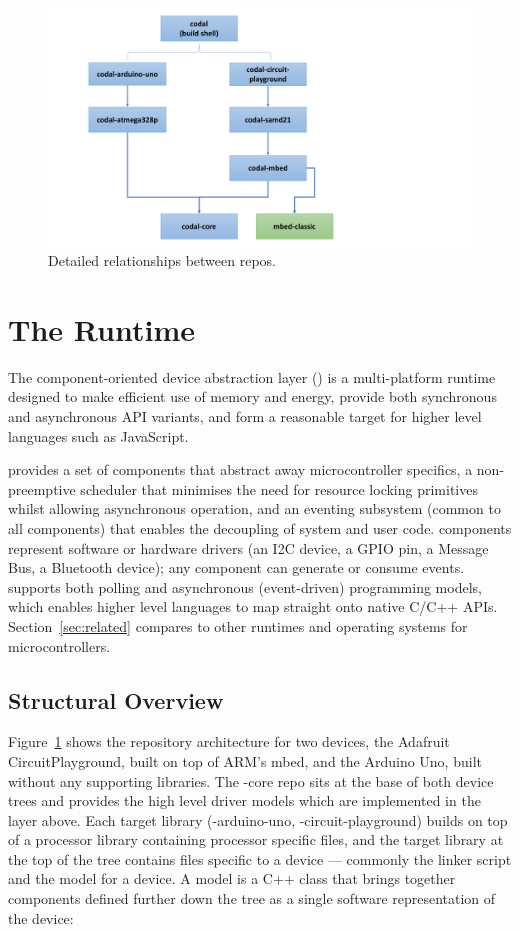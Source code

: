 \begin{figure}[t]
    \includegraphics[width=4.5in]{codalFig.pdf}
    \caption{\label{fig:codal}Detailed relationships between \CO repos.}
\end{figure}

\section{The \CO Runtime}
\label{sec:codal}

The component-oriented device abstraction layer (\CO) is a multi-platform runtime designed to make efficient use of memory and energy, provide both synchronous and asynchronous API variants, and form a reasonable target for higher level languages
such as JavaScript.

\CO provides a set of components that abstract away microcontroller specifics, a non-preemptive scheduler that minimises the need for resource locking primitives whilst allowing asynchronous operation, and an eventing subsystem (common to all components) that enables the decoupling of system and user code. \CO components represent software or hardware drivers (an I2C device, a GPIO pin, a Message Bus, a Bluetooth device); any component can generate or consume events. \CO supports both polling and asynchronous (event-driven) programming models, which enables higher level languages to map straight onto native C/C++ APIs. Section~\ref{sec:related} compares \CO to other runtimes and operating systems for microcontrollers.


\subsection{Structural Overview}

Figure~\ref{fig:codal} shows the repository architecture for two \CO devices, the Adafruit CircuitPlayground, built on top of ARM's mbed, and the Arduino Uno, built without any supporting libraries. The \COLN-core repo sits at the base of both device trees and provides the high level driver models which are implemented in the layer above. Each target library (\COLN-arduino-uno, \COLN-circuit-playground) builds on top of a processor library containing processor specific files, and the target library at the top of the tree contains files specific to a device --- commonly the linker script and the model for a device. A model is a C++ class that brings together components defined further down the tree as a single software representation of the device:

